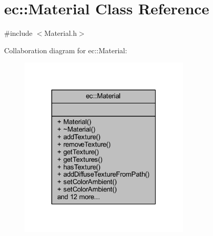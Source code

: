 \hypertarget{classec_1_1_material}{}\section{ec\+:\+:Material Class Reference}
\label{classec_1_1_material}


{\ttfamily \#include $<$Material.\+h$>$}



Collaboration diagram for ec\+:\+:Material\+:\nopagebreak
\begin{figure}[H]
\begin{center}
\leavevmode
\includegraphics[width=232pt]{classec_1_1_material__coll__graph}
\end{center}
\end{figure}
